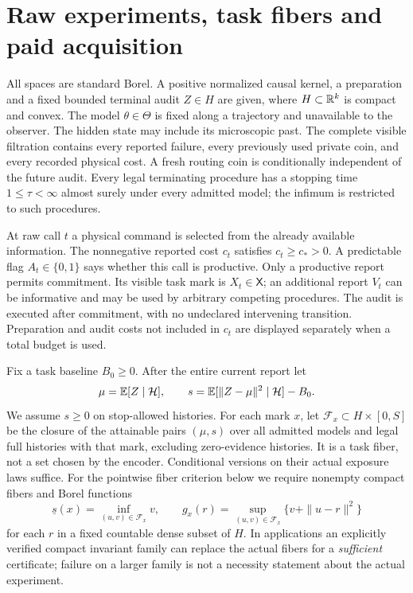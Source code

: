 \section{Raw experiments, task fibers and paid acquisition}
\label{sec:setup}
All spaces are standard Borel. A positive normalized causal kernel, a preparation and a fixed bounded terminal audit $Z\in H$ are given, where $H\subset\mathbb R^k$ is compact and convex. The model $\theta\in\Theta$ is fixed along a trajectory and unavailable to the observer. The hidden state may include its microscopic past. The complete visible filtration contains every reported failure, every previously used private coin, and every recorded physical cost. A fresh routing coin is conditionally independent of the future audit. Every legal terminating procedure has a stopping time $1\le\tau<\infty$ almost surely under every admitted model; the infimum is restricted to such procedures.

At raw call $t$ a physical command is selected from the already available information. The nonnegative reported cost $c_t$ satisfies $c_t\ge c_*>0$. A predictable flag $A_t\in\{0,1\}$ says whether this call is productive. Only a productive report permits commitment. Its visible task mark is $X_t\in\mathsf X$; an additional report $V_t$ can be informative and may be used by arbitrary competing procedures. The audit is executed after commitment, with no undeclared intervening transition. Preparation and audit costs not included in $c_t$ are displayed separately when a total budget is used.

Fix a task baseline $B_0\ge0$. After the entire current report let
\[
 \mu=\mathbb E[Z\mid\mathcal H],\qquad s=\mathbb E[\|Z-\mu\|^2\mid\mathcal H]-B_0.
\]
We assume $s\ge0$ on stop-allowed histories. For each mark $x$, let $\mathcal F_x\subset H\times[0,S]$ be the closure of the attainable pairs $(\mu,s)$ over all admitted models and legal full histories with that mark, excluding zero-evidence histories. It is a task fiber, not a set chosen by the encoder. Conditional versions on their actual exposure laws suffice. For the pointwise fiber criterion below we require nonempty compact fibers and Borel functions
\[
 \underline s(x)=\inf_{(u,v)\in\mathcal F_x}v,
 \qquad g_x(r)=\sup_{(u,v)\in\mathcal F_x}\{v+\|u-r\|^2\}
\]
for each $r$ in a fixed countable dense subset of $H$. In applications an explicitly verified compact invariant family can replace the actual fibers for a \emph{sufficient} certificate; failure on a larger family is not a necessity statement about the actual experiment.

